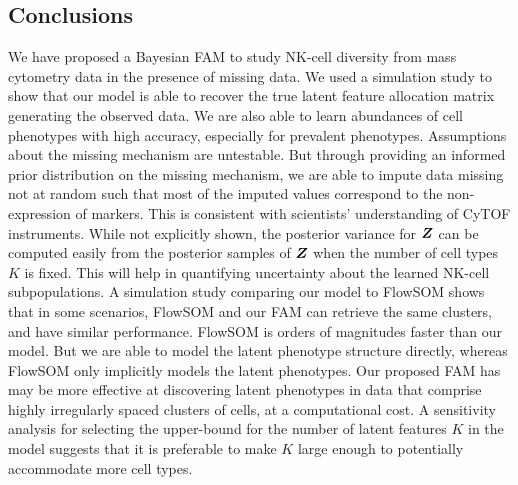 \documentclass[12pt,]{article}
\newcommand{\bZ}{\mbox{\boldmath $Z$}}
\begin{document}


\subsection{Conclusions}\label{sec:CB-conc}

We have proposed a Bayesian FAM to study NK-cell diversity from mass cytometry
data in the presence of missing data. We used a simulation study to show that
our model is able to recover the true latent feature allocation matrix
generating the observed data. We are also able to learn abundances of
cell phenotypes with high accuracy, especially for prevalent phenotypes.
%
Assumptions about the missing mechanism are untestable. But through providing
an informed prior distribution on the missing mechanism, we are able to impute
data missing not at random such that most of the imputed values correspond to
the non-expression of markers. This is consistent with scientists' understanding
of CyTOF instruments.
%
While not explicitly shown, the posterior variance for $\bZ$ can be computed
easily from the posterior samples of $\bZ$ when the number of cell types $K$ is
fixed. This will help in quantifying uncertainty about the learned NK-cell
subpopulations. 
%
A simulation study comparing our model to FlowSOM shows that in some
scenarios, FlowSOM and our FAM can retrieve the same clusters, and have similar
performance. FlowSOM is orders of magnitudes faster than our model.  But we are
able to model the latent phenotype structure directly, whereas FlowSOM only
implicitly models the latent phenotypes. Our proposed FAM has may be
more effective at discovering latent phenotypes in data that comprise highly
irregularly spaced clusters of cells, at a computational cost.
%
%
A sensitivity analysis for selecting the upper-bound for the number of latent
features $K$ in the model suggests that it is preferable to make $K$ large
enough to potentially accommodate more cell types.
\end{document}
